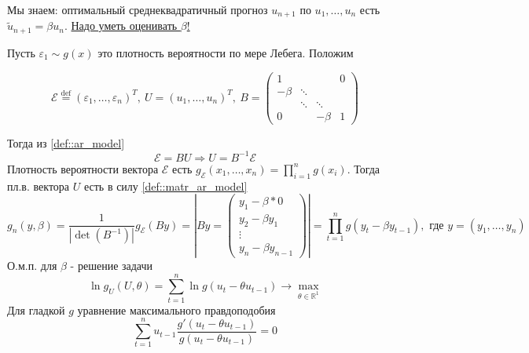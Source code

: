 \documentclass[12pt]{article}
\newcommand*{\defeq}{\stackrel{\text{def}}{=}}
\def\eps{ \varepsilon }
\def\Eps{ \mathcal{E} }
\def\R{ \mathbb{R} }
\begin{document}
Мы знаем: оптимальный среднеквадратичный прогноз $u_{n+1}$ по $u_1,\ldots,u_n$ есть $\widetilde{u}_{n+1}=\beta u_n$.
\underline{Надо уметь оценивать $\beta$!}

Пусть $\eps_1\sim g(x)$ это плотность вероятности по мере Лебега. Положим

\[\Eps\defeq(\eps_1,\ldots,\eps_n)^T,\
  U=(u_1,\ldots,u_n)^T,\
  B=\begin{pmatrix}
    1   &        &        & 0 \\
 -\beta & \ddots &        &   \\
        & \ddots & \ddots &   \\
    0   &        & -\beta & 1
 \end{pmatrix}\]

Тогда из \eqref{def::ar_model}
\begin{equation} \label{def::matr_ar_model}
    \Eps=BU\Rightarrow U=B^{-1}\Eps
\end{equation}
Плотность вероятности вектора $\Eps$ есть $g_{\Eps}(x_1,\ldots,x_n)=\prod_{i=1}^ng(x_i)$.
Тогда пл.в. вектора $U$ есть в силу \eqref{def::matr_ar_model}
\[g_n(y,\beta)=\frac{1}{\left\lvert\det(B^{-1})\right\rvert}g_{\Eps}(By)=\left\lvert By=\begin{pmatrix}
    y_1-\beta * 0 \\
    y_2-\beta y_1 \\
    \vdots \\
    y_n-\beta y_{n-1}
\end{pmatrix}\right\rvert=\prod_{t=1}^ng(y_t-\beta y_{t-1}),\text{ где }y=(y_1,\ldots,y_n)\]
О.м.п. для $\beta$ - решение задачи
\begin{equation}\label{eq::omp_beta}
    \ln g_U(U,\theta)=\sum_{t=1}^n\ln g(u_t-\theta u_{t-1})\rightarrow\max_{\theta\in\R^1}
\end{equation}
Для гладкой $g$ уравнение максимального правдоподобия
\begin{equation}\label{eq::mp_beta}
    \sum_{t=1}^nu_{t-1}\frac{g'(u_t-\theta u_{t-1})}{g(u_t-\theta u_{t-1})}=0
\end{equation}
\end{document}
